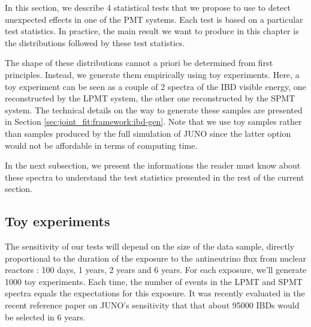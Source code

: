\documentclass[../main.tex]{subfiles}
\begin{document}
In this section, we describe 4 statistical tests that we propose to use to detect unexpected effects in one of the PMT systems. Each test is based on a particular test statistics. In practice, the main result we want to produce in this chapter is the distributions followed by these test statistics.

The shape of these distributions cannot a priori be determined from first principles. Instead, we generate them empirically using toy experiments. Here, a toy experiment can be seen as a couple of 2 spectra of the IBD visible energy, one reconstructed by the LPMT system, the other one reconstructed by the SPMT system. The technical details on the way to generate these samples are presented in Section \ref{sec:joint_fit:framework:ibd-gen}.
Note that we use toy samples rather than samples produced by the full simulation of JUNO since the latter option would not be affordable in terms of computing time.

In the next subsection, we present the informations the reader must know about these spectra to understand the test statistics presented in the rest of the current section.


%
%

\subsection{Toy experiments}
\label{sec:joint_fit:approach:data_prod}

The sensitivity of our tests will depend on the size of the data sample, directly proportional to the duration of the exposure to the antineutrino flux from nuclear reactors : 100 days, 1 years, 2 years and 6 years. For each exposure, we'll generate 1000 toy experiments. Each time, the number of events in the LPMT and SPMT spectra equals the expectations for this exposure. It was recently evaluated in the recent reference paper on JUNO's sensitivity \cite{abusleme_potential_2024} that that about 95000 IBDs would be selected in 6 years.
\end{document}
